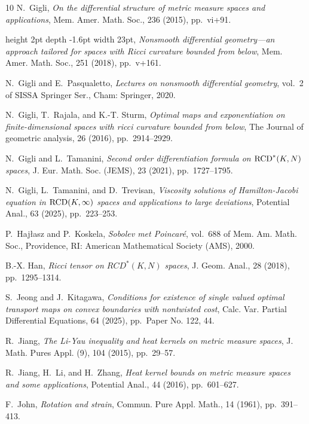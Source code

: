 \documentclass[a4paper,11pt]{article}
\numberwithin{equation}{section}
\theoremstyle{plain}
\theoremstyle{definition}
\theoremstyle{remark}
\begin{document}
\begin{thebibliography}{10}
{\sc N.~Gigli}, {\em On the differential structure of metric measure spaces and
  applications}, Mem. Amer. Math. Soc., 236 (2015), pp.~vi+91.

\leavevmode\vrule height 2pt depth -1.6pt width 23pt, {\em Nonsmooth
  differential geometry---an approach tailored for spaces with {R}icci
  curvature bounded from below}, Mem. Amer. Math. Soc., 251 (2018), pp.~v+161.

{\sc N.~Gigli and E.~Pasqualetto}, {\em Lectures on nonsmooth differential
  geometry}, vol.~2 of SISSA Springer Ser., Cham: Springer, 2020.

{\sc N.~Gigli, T.~Rajala, and K.-T. Sturm}, {\em Optimal maps and
  exponentiation on finite-dimensional spaces with ricci curvature bounded from
  below}, The Journal of geometric analysis, 26 (2016), pp.~2914--2929.

{\sc N.~Gigli and L.~Tamanini}, {\em Second order differentiation formula on
  {${\rm RCD}^*(K,N)$ spaces}}, J. Eur. Math. Soc. (JEMS), 23 (2021),
  pp.~1727--1795.

{\sc N.~Gigli, L.~Tamanini, and D.~Trevisan}, {\em Viscosity solutions of
  {H}amilton-{J}acobi equation in {${\rm RCD}(K,\infty)$} spaces and
  applications to large deviations}, Potential Anal., 63 (2025), pp.~223--253.

{\sc P.~Haj{\l}asz and P.~Koskela}, {\em Sobolev met {Poincar{\'e}}}, vol.~688
  of Mem. Am. Math. Soc., Providence, RI: American Mathematical Society (AMS),
  2000.

{\sc B.-X. Han}, {\em Ricci tensor on {${RCD}^*(K, N)$} spaces}, J. Geom.
  Anal., 28 (2018), pp.~1295--1314.

{\sc S.~Jeong and J.~Kitagawa}, {\em Conditions for existence of single valued
  optimal transport maps on convex boundaries with nontwisted cost}, Calc. Var.
  Partial Differential Equations, 64 (2025), pp.~Paper No. 122, 44.

{\sc R.~Jiang}, {\em The {Li}-{Yau} inequality and heat kernels on metric
  measure spaces}, J. Math. Pures Appl. (9), 104 (2015), pp.~29--57.

{\sc R.~Jiang, H.~Li, and H.~Zhang}, {\em Heat kernel bounds on metric measure
  spaces and some applications}, Potential Anal., 44 (2016), pp.~601--627.

{\sc F.~John}, {\em Rotation and strain}, Commun. Pure Appl. Math., 14 (1961),
  pp.~391--413.


\end{thebibliography}
\end{document}
